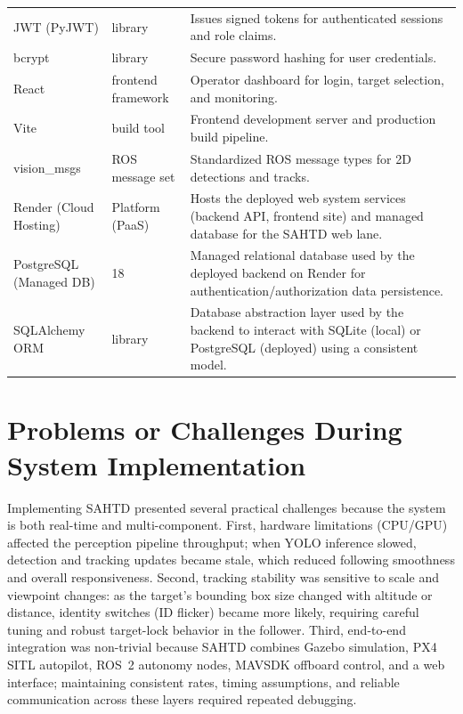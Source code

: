 \documentclass[12pt,a4paper]{report}
\begin{document}
\begin{longtable}{@{}L{0.24\textwidth} C{0.14\textwidth} L{0.58\textwidth}@{}}
JWT (PyJWT) & library & Issues signed tokens for authenticated sessions and role claims. \\
bcrypt & library & Secure password hashing for user credentials. \\
React & frontend framework & Operator dashboard for login, target selection, and monitoring. \\
Vite & build tool & Frontend development server and production build pipeline. \\
vision\_msgs & ROS message set & Standardized ROS message types for 2D detections and tracks. \\
Render (Cloud Hosting) & Platform (PaaS) & Hosts the deployed web system services (backend API, frontend site) and managed database for the SAHTD web lane. \\
PostgreSQL (Managed DB) & 18 & Managed relational database used by the deployed backend on Render for authentication/authorization data persistence. \\
SQLAlchemy ORM & library & Database abstraction layer used by the backend to interact with SQLite (local) or PostgreSQL (deployed) using a consistent model. \\



\end{longtable}
\endgroup





\section{Problems or Challenges During System Implementation}

Implementing SAHTD presented several practical challenges because the system is both real-time and multi-component. First, hardware limitations (CPU/GPU) affected the perception pipeline throughput; when YOLO inference slowed, detection and tracking updates became stale, which reduced following smoothness and overall responsiveness. Second, tracking stability was sensitive to scale and viewpoint changes: as the target’s bounding box size changed with altitude or distance, identity switches (ID flicker) became more likely, requiring careful tuning and robust target-lock behavior in the follower. Third, end-to-end integration was non-trivial because SAHTD combines Gazebo simulation, \ac{PX4} \ac{SITL} autopilot, ROS~2 autonomy nodes, \ac{MAVSDK} offboard control, and a web interface; maintaining consistent rates, timing assumptions, and reliable communication across these layers required repeated debugging.
\end{document}
